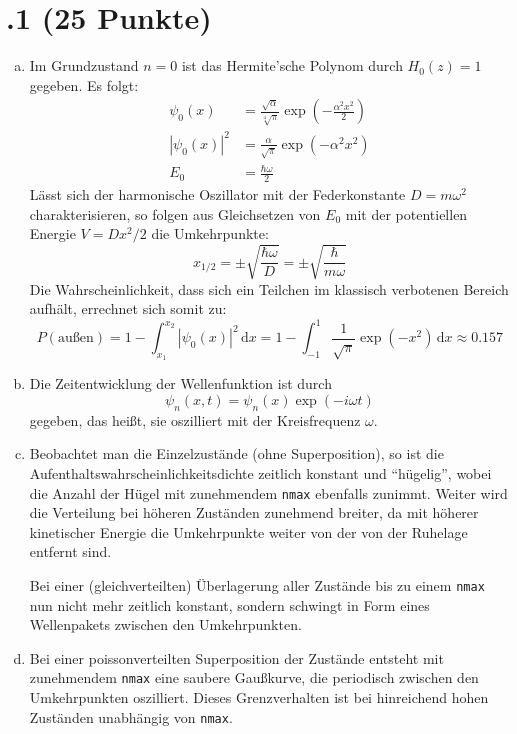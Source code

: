 \section*{\nr.1 \titone (25 Punkte)}
\begin{enumerate}[(a)]
\item Im Grundzustand $n=0$ ist das Hermite'sche Polynom durch $H_0(z)=1$ gegeben. Es folgt:
\begin{align}
\psi_0 (x) &= \frac{\sqrt{\alpha}}{\sqrt[4]{\pi}} \exp\left( -\frac{\alpha^2x^2}{2}\right) \\
\left|\psi_0 (x) \right|^2 &= \frac{\alpha}{\sqrt{\pi}} \exp\left( -\alpha^2x^2\right) \\
E_0 &= \frac{\hbar\omega}{2}
\end{align}
Lässt sich der harmonische Oszillator mit der Federkonstante $D=m\omega^2$ charakterisieren, so folgen aus Gleichsetzen von $E_0$ mit der potentiellen Energie $V=Dx^2/2$ die Umkehrpunkte:
\begin{equation}
x_{1/2} = \pm \sqrt{\frac{\hbar\omega}{D}} = \pm \sqrt{\frac{\hbar}{m\omega}}
\end{equation}
Die Wahrscheinlichkeit, dass sich ein Teilchen im klassisch verbotenen Bereich aufhält, errechnet sich somit zu:
\begin{equation}
P(\text{außen}) = 1- \int_{x_1}^{x_2}{\left|\psi_0 (x) \right|^2\,\mathrm{d}x} = 1- \int_{-1}^{1}{\frac{1}{\sqrt{\pi}} \exp(-x^2)\,\mathrm{d}x} \approx \num{0.157}
\end{equation}
\item Die Zeitentwicklung der Wellenfunktion ist durch 
\begin{equation}
\psi_n(x,t) = \psi_n(x) \exp(-i\omega t)
\end{equation}
gegeben, das heißt, sie oszilliert mit der Kreisfrequenz $\omega$.
\item Beobachtet man die Einzelzustände (ohne Superposition), so ist die Aufenthaltswahrscheinlichkeitsdichte zeitlich konstant und "`hügelig"', wobei die Anzahl der Hügel mit zunehmendem \texttt{nmax} ebenfalls zunimmt. Weiter wird die Verteilung bei höheren Zuständen zunehmend breiter, da mit höherer kinetischer Energie die Umkehrpunkte weiter von der von der Ruhelage entfernt sind.

Bei einer (gleichverteilten) Überlagerung aller Zustände bis zu einem \texttt{nmax} nun nicht mehr zeitlich konstant, sondern schwingt in Form eines Wellenpakets zwischen den Umkehrpunkten. 

\item Bei einer poissonverteilten Superposition der Zustände entsteht mit zunehmendem \texttt{nmax} eine saubere Gaußkurve, die periodisch zwischen den Umkehrpunkten oszilliert. Dieses Grenzverhalten ist bei hinreichend hohen Zuständen unabhängig von \texttt{nmax}.
\end{enumerate}